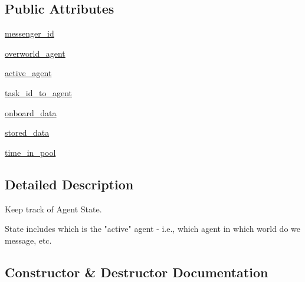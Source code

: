 \subsection*{Public Attributes}
\begin{DoxyCompactItemize}
\item 
\hyperlink{classparlai_1_1chat__service_1_1services_1_1messenger_1_1messenger__manager_1_1AgentState_ae08b5a025e6c6dbc13d69fb51cfc88ae}{messenger\+\_\+id}
\item 
\hyperlink{classparlai_1_1chat__service_1_1services_1_1messenger_1_1messenger__manager_1_1AgentState_a8a15c91823a40220f26bcea350841515}{overworld\+\_\+agent}
\item 
\hyperlink{classparlai_1_1chat__service_1_1services_1_1messenger_1_1messenger__manager_1_1AgentState_a0ab28992a20b4b8993f8a2d6df3eb3bc}{active\+\_\+agent}
\item 
\hyperlink{classparlai_1_1chat__service_1_1services_1_1messenger_1_1messenger__manager_1_1AgentState_a7221b618c3844e6b36b941b97acab338}{task\+\_\+id\+\_\+to\+\_\+agent}
\item 
\hyperlink{classparlai_1_1chat__service_1_1services_1_1messenger_1_1messenger__manager_1_1AgentState_a53cf27770ebc465d86a4d26b6b4ec9dd}{onboard\+\_\+data}
\item 
\hyperlink{classparlai_1_1chat__service_1_1services_1_1messenger_1_1messenger__manager_1_1AgentState_a4e82195a00afcbe9275c0004d61febad}{stored\+\_\+data}
\item 
\hyperlink{classparlai_1_1chat__service_1_1services_1_1messenger_1_1messenger__manager_1_1AgentState_a703c9594c7532b0badaef268001f1ba2}{time\+\_\+in\+\_\+pool}
\end{DoxyCompactItemize}


\subsection{Detailed Description}
\begin{DoxyVerb}Keep track of Agent State.

State includes which is the "active" agent - i.e., which agent in which
world do we message, etc.
\end{DoxyVerb}
 

\subsection{Constructor \& Destructor Documentation}
\mbox{\label{classparlai_1_1chat__service_1_1services_1_1messenger_1_1messenger__manager_1_1AgentState_ae384b64f65b58e2f8d9bee51af89f6cc}} 
